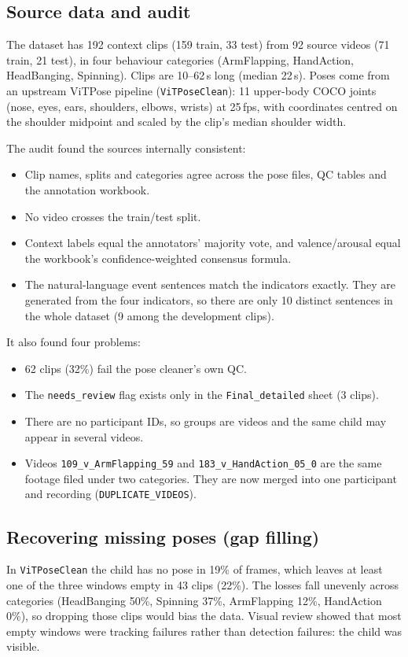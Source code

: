 \documentclass[11pt]{article}
\newcommand{\code}[1]{\texttt{#1}}
\begin{document}
\subsection{Source data and audit}
The dataset has 192 context clips (159 train, 33 test) from 92 source videos (71 train, 21 test), in four behaviour categories (ArmFlapping, HandAction, HeadBanging, Spinning). Clips are 10--62\,s long (median 22\,s). Poses come from an upstream ViTPose pipeline (\code{ViTPoseClean}): 11 upper-body COCO joints (nose, eyes, ears, shoulders, elbows, wrists) at 25\,fps, with coordinates centred on the shoulder midpoint and scaled by the clip's median shoulder width.

The audit found the sources internally consistent:
\begin{itemize}
  \item Clip names, splits and categories agree across the pose files, QC tables and the annotation workbook.
  \item No video crosses the train/test split.
  \item Context labels equal the annotators' majority vote, and valence/arousal equal the workbook's confidence-weighted consensus formula.
  \item The natural-language event sentences match the indicators exactly. They are generated from the four indicators, so there are only 10 distinct sentences in the whole dataset (9 among the development clips).
\end{itemize}

It also found four problems:
\begin{itemize}
  \item 62 clips (32\%) fail the pose cleaner's own QC.
  \item The \code{needs\_review} flag exists only in the \code{Final\_detailed} sheet (3 clips).
  \item There are no participant IDs, so groups are videos and the same child may appear in several videos.
  \item Videos \code{109\_v\_ArmFlapping\_59} and \code{183\_v\_HandAction\_05\_0} are the same footage filed under two categories. They are now merged into one participant and recording (\code{DUPLICATE\_VIDEOS}).
\end{itemize}

\subsection{Recovering missing poses (gap filling)}
In \code{ViTPoseClean} the child has no pose in 19\% of frames, which leaves at least one of the three windows empty in 43 clips (22\%). The losses fall unevenly across categories (HeadBanging 50\%, Spinning 37\%, ArmFlapping 12\%, HandAction 0\%), so dropping those clips would bias the data. Visual review showed that most empty windows were tracking failures rather than detection failures: the child was visible.
\end{document}

